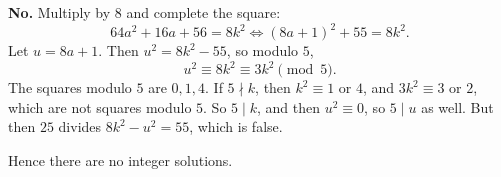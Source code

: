 \textbf{No.} Multiply by $8$ and complete the square:
\[
64a^2+16a+56=8k^2\iff (8a+1)^2+55=8k^2 .
\]
Let $u=8a+1$. Then $u^2=8k^2-55$, so modulo $5$,
\[
u^2\equiv 8k^2\equiv3k^2\pmod5 .
\]
The squares modulo $5$ are $0,1,4$. If $5\nmid k$, then $k^2\equiv1$ or $4$, and $3k^2\equiv3$ or $2$, which are not squares modulo $5$. So $5\mid k$, and then $u^2\equiv0$, so $5\mid u$ as well. But then $25$ divides $8k^2-u^2=55$, which is false.

Hence there are no integer solutions.
